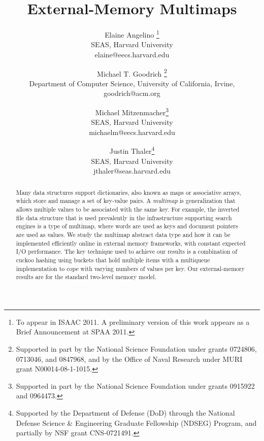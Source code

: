 \documentclass[11pt,letterpaper]{article}
\begin{document}
\renewenvironment{proof}{\noindent{\bf Proof:}}{\hspace*{\fill}\rule{6pt}{6pt}\bigskip}

\title{External-Memory Multimaps}
\author{Elaine Angelino \thanks{To appear in ISAAC 2011. A preliminary version of this work appears as a Brief Announcement at SPAA 2011.}  \\[6pt]
SEAS,  Harvard University\\
elaine@eecs.harvard.edu 
\and 
Michael T. Goodrich \thanks{Supported in part by the National Science
Foundation under grants 0724806, 0713046, and 0847968, and by the
Office of Naval Research under MURI grant N00014-08-1-1015.}\\[6pt]
Department of Computer Science, University of California, Irvine,\\
goodrich@acm.org
 \and 
 Michael Mitzenmacher\thanks{Supported in part by 
the National Science Foundation under grants 0915922 and 0964473.} \\[6pt]
SEAS, Harvard University\\
michaelm@eecs.harvard.edu 
 \and 
 Justin Thaler\thanks{Supported by the Department of Defense (DoD) through the National Defense Science \& Engineering Graduate Fellowship (NDSEG) Program, and partially by NSF grant CNS-0721491.} \\[6pt]
SEAS, Harvard University\\
jthaler@seas.harvard.edu 
}

\date{}
\maketitle 

\vspace{-0.7 cm}

\begin{abstract}
Many data structures support dictionaries, also known as maps or
associative arrays, which store and manage a set of key-value pairs.
A \emph{multimap} is generalization that allows multiple values to be
associated with the same key.  
For example, the inverted file data structure that is used
prevalently in the infrastructure supporting search engines is a
type of multimap, where words are used as keys and document pointers
are used as values.
We study the multimap abstract data
type and how it can be implemented efficiently online in external memory frameworks, with constant expected I/O performance.  
The key technique used to
achieve our results is a combination of cuckoo hashing using buckets that hold
multiple items with a multiqueue implementation to
cope with varying numbers of values per key.
Our external-memory results are for the standard two-level memory
model.\end{abstract}
\end{document}
